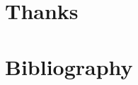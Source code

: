 \documentclass[preprint,12pt,authoryear]{elsarticle}
\begin{document}
\section*{Thanks}



\section*{Bibliography}
 

\end{document}
